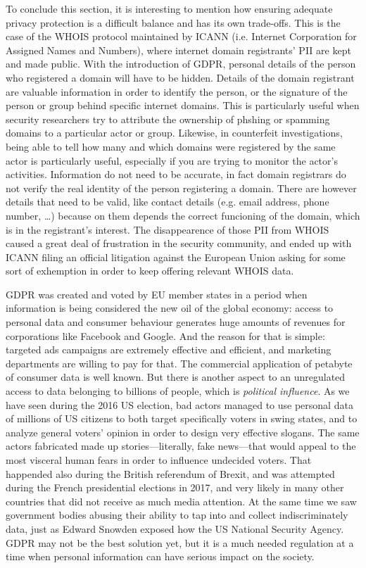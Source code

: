 To conclude this section, it is interesting to mention how ensuring
adequate privacy protection is a difficult balance and has its own trade-offs. This is
the case of the WHOIS protocol maintained by ICANN (i.e. Internet Corporation
for Assigned Names and Numbers), where internet domain registrants' PII are
kept and made public. With the introduction of GDPR, personal details of the
person who registered a domain will have to be hidden. Details of the domain
registrant are valuable information in order to identify the person, or the
signature of the person or group behind specific internet domains. This is
particularly useful when security researchers try to attribute the ownership of
phshing or spamming domains to a particular actor or group. Likewise, in
counterfeit investigations, being able to tell how many and which domains were registered by
the same actor is particularly useful, especially if you are trying to monitor
the actor's activities. Information do not need to be accurate, in fact domain
registrars do not verify the real identity of the person registering a domain.
There are however details that need to be valid, like contact details (e.g.
email address, phone number, \ldots) because on them depends the correct funcioning of
the domain, which is in the registrant's interest. The disappearence of those
PII from WHOIS caused a great deal of frustration in the security community, and
ended up with ICANN filing an official litigation against the European Union
asking for some sort of exhemption in order to keep offering relevant WHOIS
data.

GDPR was created and voted by EU member states in a period when information is
being considered the new oil of the global economy: access to personal data and
consumer behaviour generates huge amounts of revenues for corporations like
Facebook and Google. And the reason for that is simple: targeted ads campaigns
are extremely effective and efficient, and marketing departments are willing to pay
for that. The commercial application of petabyte of consumer data is well known.
But there is another aspect to an unregulated access to data belonging to
billions of people, which is \emph{political influence}. As we have seen during
the 2016 US election, bad actors managed to use personal data of millions of US
citizens to both target specifically voters in swing states, and to analyze
general voters' opinion in order to design very effective slogans. The same
actors fabricated made up stories---literally, fake news---that would appeal to
the most visceral human fears in order to influence undecided voters. That
happended also during the British referendum of Brexit, and was attempted during
the French presidential elections in 2017, and very likely in many other
countries that did not receive as much media attention. At the same time we
saw government bodies abusing their ability to tap into and collect
indiscriminately data, just as Edward Snowden exposed how the US National
Security Agency. GDPR may not be the best solution yet, but it is a much needed
regulation at a time when personal information can have serious impact on the
society.

